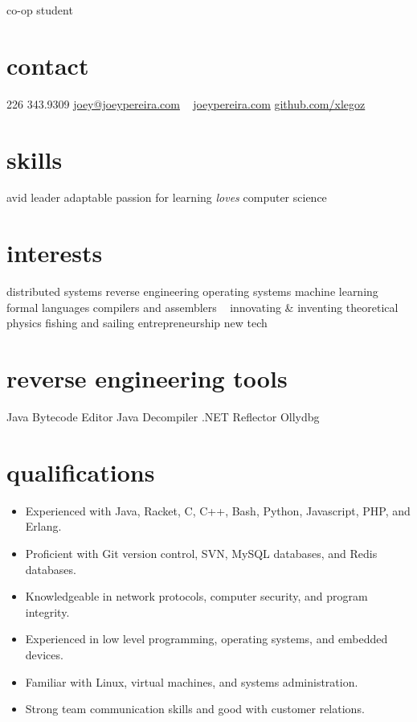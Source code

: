 \documentclass[]{friggeri-cv}
\begin{document}
       {co-op student}


\begin{aside}
  \section{contact}
    226 343.9309
    \href{mailto:joey@joeypereira.com}{joey@joeypereira.com}
    ~
    \href{http://joeypereira.com}{joeypereira.com}
    \href{http://www.github.com/xlegoz}{github.com/xlegoz}
  \section{skills}
  avid leader
  adaptable
  passion for learning
  {\em loves} computer science
  \section{interests}
  	distributed systems
  	reverse engineering
  	operating systems
  	machine learning
  	formal languages
  	compilers and assemblers
  	~
	innovating \& inventing
  	theoretical physics
  	fishing and sailing
  	entrepreneurship
  	new tech
  \section{reverse engineering tools}
  	Java Bytecode Editor
  	Java Decompiler
  	.NET Reflector
  	Ollydbg  	
\end{aside}


\section{qualifications}
{
  \setlength{\itemsep}{0pt}
  \setlength{\parskip}{0pt}
  \setlength{\parsep}{0pt}
  \setlength{\itemindent}{0em}
  \setlength{\leftmargin}{0em}
\begin{itemize}
\item Experienced with Java, Racket, C, C++, Bash, Python, Javascript, PHP, and Erlang.
\item Proficient with Git version control, SVN, MySQL databases, and Redis databases.
\item Knowledgeable in network protocols, computer security, and program integrity.
\item Experienced in low level programming, operating systems, and embedded devices.
\item Familiar with Linux, virtual machines, and systems administration.
\item Strong team communication skills and good with customer relations.
\end{itemize}
}
\end{document}
